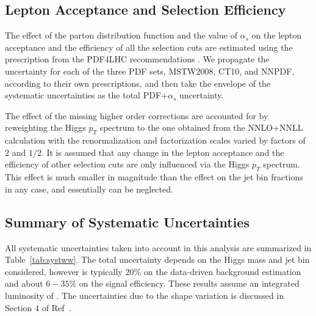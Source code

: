 \subsection{Lepton Acceptance and Selection Efficiency }

The effect of the parton distribution function and the value of $\alpha_{s}$
 on the lepton acceptance and the efficiency of all the selection cuts are 
estimated using the prescription from the PDF4LHC recommendations \cite{PDF4LHC}. We 
propagate the uncertainty for each of the three PDF sets, MSTW2008, CT10, and
NNPDF, according to their own prescriptions, and then take the envelope
of the systematic uncertainties as the total PDF+$\alpha_{s}$  uncertainty. 

The effect of the missing higher order corrections are accounted for by
reweighting the Higgs $p_{T}$ spectrum to the one obtained from the
NNLO+NNLL calculation with the renormalization and factorization scales
varied by factors of $2$ and $1/2$. It is assumed that any change in the
lepton acceptance and the efficiency of other selection cuts are only
influenced via the Higgs $p_{T}$ spectrum. This effect is much smaller in 
magnitude than the effect on the jet bin fractions in any case, and 
essentially can be neglected.



\subsection{Summary of Systematic Uncertainties}

All systematic uncertainties taken into account in this analysis
are summarized in Table~\ref{tab:systww}.
The total uncertainty depends on the Higgs mass and jet bin considered,
however is typically $20\%$ on the data-driven background estimation and about $6-35\%$ 
on the signal efficiency. These results assume an integrated luminosity of \intlumi. 
The uncertainties due to the shape variation is discussed in Section 4 of Ref~\cite{shapeananote}. 


